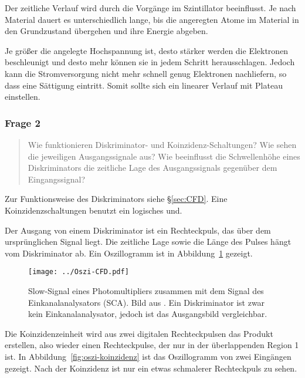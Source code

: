 \documentclass[11pt, ngerman, fleqn, DIV=15, headinclude, BCOR=2cm]{scrreprt}
\begin{document}
Der zeitliche Verlauf wird durch die Vorgänge im Szintillator beeinflusst. Je
nach Material dauert es unterschiedlich lange, bis die angeregten Atome im
Material in den Grundzustand übergehen und ihre Energie abgeben.


Je größer die angelegte Hochspannung ist, desto stärker werden die Elektronen
beschleunigt und desto mehr können sie in jedem Schritt herausschlagen. Jedoch
kann die Stromversorgung nicht mehr schnell genug Elektronen nachliefern, so
dass eine Sättigung eintritt. Somit sollte sich ein linearer Verlauf mit
Plateau einstellen.

\subsubsection{Frage 2}

\begin{quote}
    Wie funktionieren Diskriminator- und Koinzidenz-Schaltungen? Wie sehen die
    jeweiligen Ausgangssignale aus? Wie beeinflusst die Schwellenhöhe eines
    Diskriminators die zeitliche Lage des Ausgangssignals gegenüber dem
    Eingangssignal?
\end{quote}

Zur Funktionsweise des Diskriminators siehe §\ref{sec:CFD}. Eine
Koinzidenzschaltungen benutzt ein logisches und.

Der Ausgang von einem Diskriminator ist ein Rechteckpuls, das über dem
ursprünglichen Signal liegt. Die zeitliche Lage sowie die Länge des Pulses
hängt vom Diskriminator ab. Ein Oszillogramm ist in
Abbildung~\ref{fig:oszi-cfd} gezeigt.

\begin{figure}[htbp]
    \centering
    \texttt{[image: ../Oszi-CFD.pdf]}
    \caption{%
        Slow-Signal eines Photomultipliers zusammen mit dem
        Signal des Einkanalanalysators (SCA). Bild aus
        \parencite[Abbildung~2.8]{Ueding/525}. Ein Diskriminator ist zwar kein
        Einkanalanalysator, jedoch ist das Ausgangsbild vergleichbar.
    }
    \label{fig:oszi-cfd}
\end{figure}

Die Koinzidenzeinheit wird aus zwei digitalen Rechteckpulsen das Produkt
erstellen, also wieder einen Rechteckpulse, der nur in der überlappenden Region
1 ist. In Abbildung~\ref{fig:oszi-koinzidenz} ist das Oszillogramm von zwei
Eingängen gezeigt. Nach der Koinzidenz ist nur ein etwas schmalerer
Rechteckpuls zu sehen.
\end{document}
